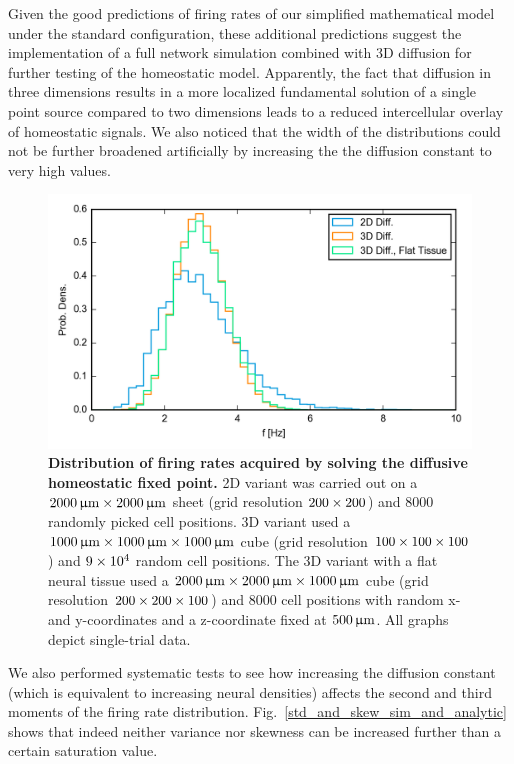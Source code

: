 \documentclass[10pt,letterpaper]{article}
\begin{document}
Given the good predictions of firing rates of our simplified mathematical model under the standard configuration, these additional predictions suggest the implementation of a full network simulation combined with 3D diffusion for further testing of the homeostatic model. Apparently, the fact that diffusion in three dimensions results in a more localized fundamental solution of a single point source compared to two dimensions leads to a reduced intercellular overlay of homeostatic signals. We also noticed that the width of the distributions could not be further broadened artificially by increasing the the diffusion constant to very high values.
\begin{figure}
\includegraphics[width=\textwidth]{./figures/diff_test_combined.png}
\caption{{\bf Distribution of firing rates acquired by solving the diffusive homeostatic fixed point.} 2D variant was carried out on a $\rm 2000\, \upmu m \times 2000\, \upmu m$ sheet (grid resolution $\rm 200 \times 200$) and $8000$ randomly picked cell positions. 3D variant used a $\rm 1000\, \upmu m \times 1000\, \upmu m \times 1000\, \upmu m$ cube (grid resolution $\rm 100 \times 100 \times 100$) and $\rm 9\times 10^4$ random cell positions. The 3D variant with a flat neural tissue used a $\rm 2000\, \upmu m \times 2000\, \upmu m \times 1000\, \upmu m$ cube (grid resolution $\rm 200 \times 200 \times 100$) and $8000$ cell positions with random x- and y-coordinates and a z-coordinate fixed at $\rm 500\, \upmu m$. All graphs depict single-trial data.}
\label{Large_Diff_Test}
\end{figure}

We also performed systematic tests to see how increasing the diffusion constant (which is equivalent to increasing neural densities) affects the second and third moments of the firing rate distribution. Fig.~\ref{std_and_skew_sim_and_analytic} shows that indeed neither variance nor skewness can be increased further than a certain saturation value.
\end{document}
